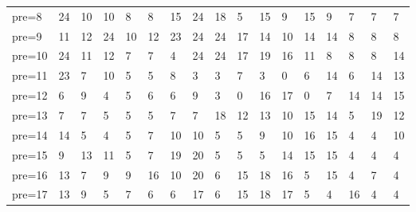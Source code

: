 \documentclass[11pt]{article}
\begin{document}
\begin{tabular}{lllllllllllllllll}
	 pre=8       & 24          & 10          & 10          & 8           & 8           & 15          & 24          & 18          & 5           & 15          & 9           & 15          & 9           & 7           & 7           & 7          \\
	 pre=9       & 11          & 12          & 24          & 10          & 12          & 23          & 24          & 24          & 17          & 14          & 10          & 14          & 14          & 8           & 8           & 8          \\
	 pre=10      & 24          & 11          & 12          & 7           & 7           & 4           & 24          & 24          & 17          & 19          & 16          & 11          & 8           & 8           & 8           & 14         \\
	 pre=11      & 23          & 7           & 10          & 5           & 5           & 8           & 3           & 3           & 7           & 3           & 0           & 6           & 14          & 6           & 14          & 13         \\
	 pre=12      & 6           & 9           & 4           & 5           & 6           & 6           & 9           & 3           & 0           & 16          & 17          & 0           & 7           & 14          & 14          & 15         \\
	 pre=13      & 7           & 7           & 5           & 5           & 5           & 7           & 7           & 18          & 12          & 13          & 10          & 15          & 14          & 5           & 19          & 12         \\
	 pre=14      & 14          & 5           & 4           & 5           & 7           & 10          & 10          & 5           & 5           & 9           & 10          & 16          & 15          & 4           & 4           & 10         \\
	 pre=15      & 9           & 13          & 11          & 5           & 7           & 19          & 20          & 5           & 5           & 5           & 14          & 15          & 15          & 4           & 4           & 4          \\
	 pre=16      & 13          & 7           & 9           & 9           & 16          & 10          & 20          & 6           & 15          & 18          & 16          & 5           & 15          & 4           & 7           & 4          \\
	 pre=17      & 13          & 9           & 5           & 7           & 6           & 6           & 17          & 6           & 15          & 18          & 17          & 5           & 4           & 16          & 4           & 4          \\

\end{tabular}
\end{document}
